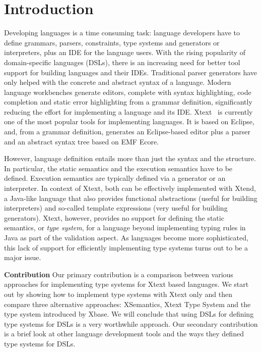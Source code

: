 \section{Introduction}
\label{sec:introduction}
 
Developing languages is a time consuming task: language developers have to
define grammars, parsers, constraints, type systems and generators or interpreters, plus an IDE
for the language users. With the rising popularity of domain-specific languages
(DSLs), there is an increasing need for better tool support for building
languages and their IDEs. Traditional parser generators have only helped with the concrete
and abstract syntax of a language. Modern language workbenches generate editors,
complete with syntax highlighting, code completion and static error highlighting
from a grammar definition, significantly reducing the effort for implementing a
language and its IDE. 
Xtext~\cite{xtext} is currently one of the most popular tools for implementing
languages.
It is based on Eclipse, and, from a grammar definition, generates an Eclipse-based
editor plus a parser and an abstract syntax tree based on EMF Ecore. 

However, language definition entails more than just the syntax and the
structure. In particular, the static semantics and the execution semantics have
to be defined. Execution semantics are typically defined via a generator or an
interpreter. In context of Xtext, both can be effectively implemented with
Xtend, a Java-like language that also provides functional abstractions (useful
for building interpreters) and so-called template expressions (very useful for
building generators). Xtext, however, provides no support for defining the
static semantics, or \emph{type system}, for a language beyond implementing
typing rules in Java as part of the validation aspect. As languages become more
sophisticated, this lack of support for efficiently implementing type systems
turns out to be a major issue.


\textbf{Contribution} Our primary contribution is a comparison between various
approaches for implementing type systems for Xtext based languages. We start out
by showing how to implement type systems with Xtext only and then compare three
alternative approaches: XSemantics, Xtext Type System and the type system introduced 
by Xbase. We will conclude that using DSLs for defining type systems for DSLs is
a very worthwhile approach. Our secondary contribution is a brief look
at other language development tools and the ways they defined type systems for
DSLs.

